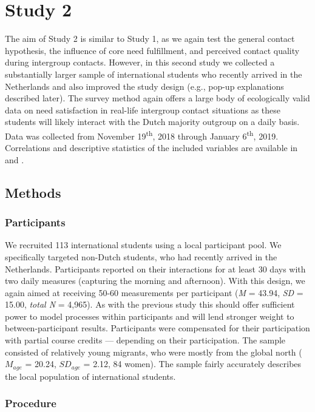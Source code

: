 \section{Study 2}

The aim of Study 2 is similar to Study 1, as we again test the general
contact hypothesis, the influence of core need fulfillment, and
perceived contact quality during intergroup contacts. However, in this
second study we collected a substantially larger sample of international
students who recently arrived in the Netherlands and also improved the
study design (e.g., pop-up explanations described later). The survey
method again offers a large body of ecologically valid data on need
satisfaction in real-life intergroup contact situations as these
students will likely interact with the Dutch majority outgroup on a
daily basis. Data was collected from November 19\textsuperscript{th},
2018 through January 6\textsuperscript{th}, 2019. Correlations and
descriptive statistics of the included variables are available in
 and .

\subsection{Methods}

\subsubsection{Participants}

We recruited 113 international students using a local participant pool.
We specifically targeted non-Dutch students, who had recently arrived in
the Netherlands. Participants reported on their interactions for at
least 30 days with two daily measures (capturing the morning and
afternoon). With this design, we again aimed at receiving 50-60
measurements per participant (\textit{M} = 43.94, \textit{SD} = 15.00,
\textit{total N} = 4,965). As with the previous study this should offer
sufficient power to model processes within participants and will lend
stronger weight to between-participant results. Participants were
compensated for their participation with partial course credits ---
depending on their participation. The sample consisted of relatively
young migrants, who were mostly from the global north (\(M_{age}\) =
20.24, \(SD_{age}\) = 2.12, 84 women). The sample fairly accurately
describes the local population of international students.

\subsubsection{Procedure}

